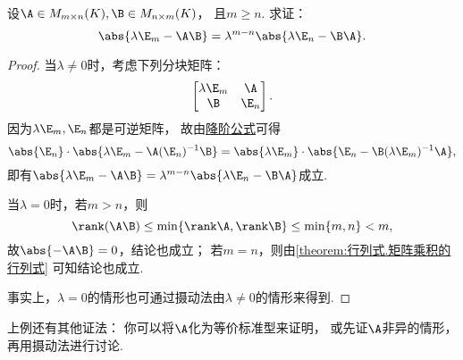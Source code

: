 \begin{example}\label{example:单位矩阵与两矩阵乘积之差.单位矩阵与两矩阵乘积之差的行列式}
设\(\A \in M_{m \times n}(K),
\B \in M_{n \times m}(K)\)，
且\(m \geq n\).
求证：\begin{equation}
	\abs{\lambda\E_m-\A\B} = \lambda^{m-n} \abs{\lambda\E_n-\B\A}.
\end{equation}
\begin{proof}
当\(\lambda\neq0\)时，考虑下列分块矩阵：\[
	\begin{bmatrix}
		\lambda\E_m & \A \\
		\B & \E_n
	\end{bmatrix}.
\]
因为\(\lambda\E_m,\E_n\)都是可逆矩阵，
故由\hyperref[theorem:逆矩阵.行列式降阶定理]{降阶公式}可得\[
	\abs{\E_n} \cdot \abs{\lambda\E_m - \A (\E_n)^{-1} \B}
	= \abs{\lambda\E_m} \cdot \abs{\E_n - \B (\lambda\E_m)^{-1} \A},
\]
即有\(\abs{\lambda\E_m-\A\B} = \lambda^{m-n} \abs{\lambda\E_n-\B\A}\)成立.

当\(\lambda=0\)时，若\(m>n\)，则\[
	\rank(\A\B) \leq \min\{\rank\A,\rank\B\} \leq \min\{m,n\} < m,
\]
故\(\abs{-\A\B}=0\)，结论也成立；
若\(m = n\)，则由\cref{theorem:行列式.矩阵乘积的行列式} 可知结论也成立.

事实上，\(\lambda=0\)的情形也可通过摄动法由\(\lambda\neq0\)的情形来得到.
\end{proof}
\end{example}
上例还有其他证法：
你可以将\(\A\)化为等价标准型来证明，
或先证\(\A\)非异的情形，再用摄动法进行讨论.

